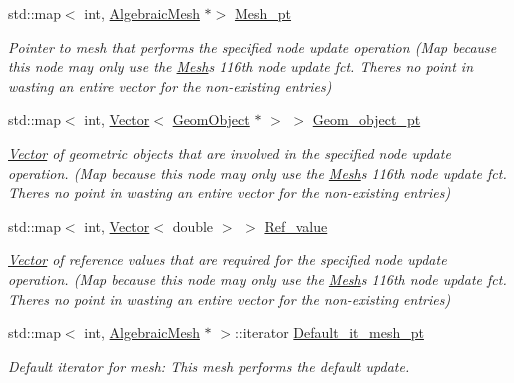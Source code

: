 \begin{DoxyCompactItemize}
\item 
std\+::map$<$ int, \hyperlink{classoomph_1_1AlgebraicMesh}{Algebraic\+Mesh} $\ast$$>$ \hyperlink{classoomph_1_1AlgebraicNode_af60d3301f8ffd16bcd3ee32809beebd8}{Mesh\+\_\+pt}
\begin{DoxyCompactList}\small\item\em Pointer to mesh that performs the specified node update operation (Map because this node may only use the \hyperlink{classoomph_1_1Mesh}{Mesh}\textquotesingle{}s 116th node update fct. There\textquotesingle{}s no point in wasting an entire vector for the non-\/existing entries) \end{DoxyCompactList}\item 
std\+::map$<$ int, \hyperlink{classoomph_1_1Vector}{Vector}$<$ \hyperlink{classoomph_1_1GeomObject}{Geom\+Object} $\ast$ $>$ $>$ \hyperlink{classoomph_1_1AlgebraicNode_a1e378862db7979494c3d224df3f98b2b}{Geom\+\_\+object\+\_\+pt}
\begin{DoxyCompactList}\small\item\em \hyperlink{classoomph_1_1Vector}{Vector} of geometric objects that are involved in the specified node update operation. (Map because this node may only use the \hyperlink{classoomph_1_1Mesh}{Mesh}\textquotesingle{}s 116th node update fct. There\textquotesingle{}s no point in wasting an entire vector for the non-\/existing entries) \end{DoxyCompactList}\item 
std\+::map$<$ int, \hyperlink{classoomph_1_1Vector}{Vector}$<$ double $>$ $>$ \hyperlink{classoomph_1_1AlgebraicNode_a64362fcb07761e9d523c5c6de01612e0}{Ref\+\_\+value}
\begin{DoxyCompactList}\small\item\em \hyperlink{classoomph_1_1Vector}{Vector} of reference values that are required for the specified node update operation. (Map because this node may only use the \hyperlink{classoomph_1_1Mesh}{Mesh}\textquotesingle{}s 116th node update fct. There\textquotesingle{}s no point in wasting an entire vector for the non-\/existing entries) \end{DoxyCompactList}\item 
std\+::map$<$ int, \hyperlink{classoomph_1_1AlgebraicMesh}{Algebraic\+Mesh} $\ast$ $>$\+::iterator \hyperlink{classoomph_1_1AlgebraicNode_ac8cb7e56e80f1c0f3e200562d2b1d39e}{Default\+\_\+it\+\_\+mesh\+\_\+pt}
\begin{DoxyCompactList}\small\item\em Default iterator for mesh\+: This mesh performs the default update. \end{DoxyCompactList}\item 
$$
\end{DoxyCompactItemize}
